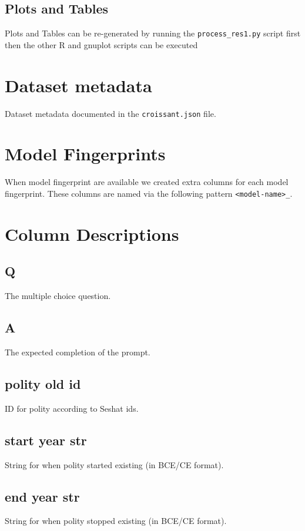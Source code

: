\documentclass[11pt]{article}
\begin{document}
\subsection*{Plots and Tables}
\label{sec:orgc6178a3}
Plots and Tables can be re-generated by running the \texttt{process\_res1.py}  script first then the other R and gnuplot scripts can be executed

\section*{Dataset metadata}
\label{sec:org4021998}
Dataset metadata documented in the \texttt{croissant.json} file.

\section*{Model Fingerprints}
\label{sec:orgf28ff0e}
When model fingerprint are available we created extra columns for each model fingerprint. These columns are named via the following pattern \texttt{<model-name>\_<model-fingerprint>}.

\section*{Column Descriptions}
\label{sec:org62df52a}
\subsection*{Q}
\label{sec:orge5cd282}
The multiple choice question.
\subsection*{A}
\label{sec:org14f5f48}
The expected completion of the prompt.
\subsection*{polity old id}
\label{sec:org9ec4902}
ID for polity according to Seshat ids.
\subsection*{start year str}
\label{sec:org0561ed4}
String for when polity started existing (in BCE/CE format).
\subsection*{end year str}
\label{sec:org937d4fb}
String for when polity stopped existing (in BCE/CE format).
\end{document}
